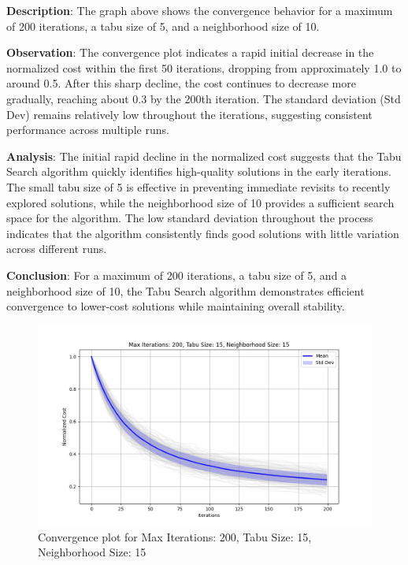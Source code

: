 \documentclass[
]{article}
\begin{document}
    \textbf{Description}: The graph above shows the convergence behavior for a maximum of 200 iterations, a tabu size of 5, and a neighborhood size of 10.

    \textbf{Observation}: The convergence plot indicates a rapid initial decrease in the normalized cost within the first 50 iterations, dropping from approximately 1.0 to around 0.5. After this sharp decline, the cost continues to decrease more gradually, reaching about 0.3 by the 200th iteration. The standard deviation (Std Dev) remains relatively low throughout the iterations, suggesting consistent performance across multiple runs.

    \textbf{Analysis}: The initial rapid decline in the normalized cost suggests that the Tabu Search algorithm quickly identifies high-quality solutions in the early iterations. The small tabu size of 5 is effective in preventing immediate revisits to recently explored solutions, while the neighborhood size of 10 provides a sufficient search space for the algorithm. The low standard deviation throughout the process indicates that the algorithm consistently finds good solutions with little variation across different runs.

    \textbf{Conclusion}: For a maximum of 200 iterations, a tabu size of 5, and a neighborhood size of 10, the Tabu Search algorithm demonstrates efficient convergence to lower-cost solutions while maintaining overall stability.

    \begin{figure}[H]
        \centering
        \includegraphics[width=\textwidth]{tabu_search/max_iter_200_tabu_size_15_neighborhood_size_15}
        \caption{Convergence plot for Max Iterations: 200, Tabu Size: 15, Neighborhood Size: 15}
        \label{fig:ts_200_15_15}
    \end{figure}
\end{document}
